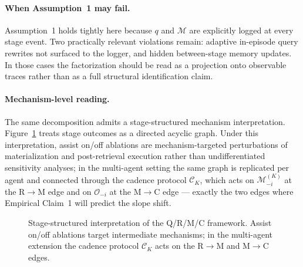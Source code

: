 \documentclass{article}
\begin{document}
\paragraph{When Assumption~1 may fail.}
Assumption~1 holds tightly here because $q$ and $\mathcal{M}$ are
explicitly logged at every stage event. Two practically relevant
violations remain: adaptive in-episode query rewrites not surfaced to
the logger, and hidden between-stage memory updates. In those cases
the factorization should be read as a projection onto observable
traces rather than as a full structural identification claim.

\paragraph{Mechanism-level reading.}
The same decomposition admits a stage-structured mechanism
interpretation. Figure~\ref{fig:causal} treats stage outcomes as a
directed acyclic graph. Under this interpretation, assist on/off
ablations are mechanism-targeted perturbations of materialization and
post-retrieval execution rather than undifferentiated sensitivity
analyses; in the multi-agent setting the same graph is replicated per
agent and connected through the cadence protocol $\mathcal{C}_K$,
which acts on $\mathcal{M}_{-i}^{(K)}$ at the R$\to$M edge and on
$\mathcal{O}_{-i}$ at the M$\to$C edge --- exactly the two edges where
Empirical Claim~1 will predict the slope shift.

\begin{figure}[t]
  \centering
  \caption{Stage-structured interpretation of the Q/R/M/C framework. Assist on/off ablations target intermediate mechanisms; in the multi-agent extension the cadence protocol $\mathcal{C}_K$ acts on the R$\to$M and M$\to$C edges.}
  \label{fig:causal}
\end{figure}
\end{document}
